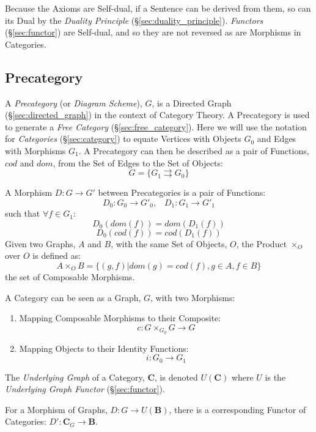 Because the Axioms are Self-dual, if a Sentence can be derived from
them, so can its Dual by the \emph{Duality Principle}
(\S\ref{sec:duality_principle}). \emph{Functors}
(\S\ref{sec:functor}) are Self-dual, and so they are not reversed as
are Morphisms in Categories.



\subsection{Precategory}\label{sec:precategory}

A \emph{Precategory} (or \emph{Diagram Scheme}), $G$, is a Directed
Graph (\S\ref{sec:directed_graph}) in the context of Category
Theory. A Precategory is used to generate a \emph{Free Category}
(\S\ref{sec:free_category}). Here we will use the notation for
\emph{Categories} (\S\ref{sec:category}) to equate Vertices with
Objects $G_0$ and Edges with Morphisms $G_1$. A Precategory can then
be described as a pair of Functions, $cod$ and $dom$, from the Set of
Edges to the Set of Objects:
\[
    G = \{G_1 \rightrightarrows G_0\}
\]

A Morphism $D : G \rightarrow G'$ between Precategories is a pair of
Functions:
\[
    D_0 : G_0 \rightarrow G'_0, \;\;\; D_1 : G_1 \rightarrow G'_1
\]
such that $\forall f \in G_1$:
\[
    D_0(dom(f)) = dom(D_1(f))
\]\[
    D_0(cod(f)) = cod(D_1(f))
\]
Given two Graphs, $A$ and $B$, with the same Set of Objects, $O$, the
Product $\times_O$ over $O$ is defined as:
\[
    A \times_O B = \{ (g,f) | dom(g) = cod(f), g \in A, f \in B \}
\]
the set of Composable Morphisms.

A Category can be seen as a Graph, $G$, with two Morphisms:
\begin{enumerate}
    \item Mapping Composable Morphisms to their Composite:
        \[c : G \times_{G_0} G \rightarrow G\]
    \item Mapping Objects to their Identity Functions:
        \[i: G_0 \rightarrow G_1\]
\end{enumerate}
The \emph{Underlying Graph} of a Category, $\mathbf{C}$, is denoted
$U(\mathbf{C})$ where $U$ is the \emph{Underlying Graph Functor}
(\S\ref{sec:functor}).

For a Morphism of Graphs, $D : G \rightarrow U(\mathbf{B})$, there is
a corresponding Functor of Categories: $D' : \mathbf{C}_G \rightarrow
\mathbf{B}$.

